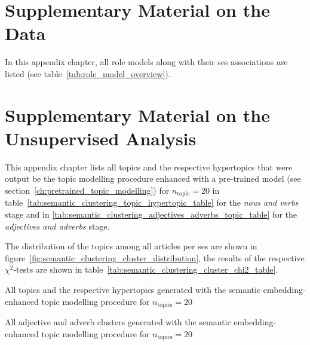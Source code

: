 \renewcommand{\imagepath}{../90-appendix/img}

\appendix

\chapter{Supplementary Material on the Data}\label{ch:data_appendix}
In this appendix chapter, all role models along with their \gls{ses} associations are listed (see table~\ref{tab:role_model_overview}).




\chapter{Supplementary Material on the Unsupervised Analysis}\label{ch:unsupervised_appendix}
This appendix chapter lists all topics and the respective hypertopics that were output be the topic modelling procedure enhanced with a pre-trained model (see section~\ref{ch:pretrained_topic_modelling}) for $n_\text{topic} = 20$ in table~\ref{tab:semantic_clustering_topic_hypertopic_table} for the \textit{nous and verbs} stage and in \ref{tab:semantic_clustering_adjectives_adverbs_topic_table} for the \textit{adjectives and adverbs} stage.

The distribution of the topics among all articles per \gls{ses} are shown in figure~\ref{fig:semantic_clustering_cluster_distribution}, the results of the respective $\chi^2$-tests are shown in table~\ref{tab:semantic_clustering_cluster_chi2_table}.
\begin{table}[h]
    \centering
    
    \caption{All topics and the respective hypertopics generated with the semantic embedding-enhanced topic modelling procedure for $n_\text{topics}=20$}\label{tab:semantic_clustering_topic_hypertopic_table}
\end{table}

\begin{table}
    \centering
    
    \caption{All adjective and adverb clusters generated with the semantic embedding-enhanced topic modelling procedure for $n_\text{topics}=20$}\label{tab:semantic_clustering_adjectives_adverbs_topic_table}
\end{table}

